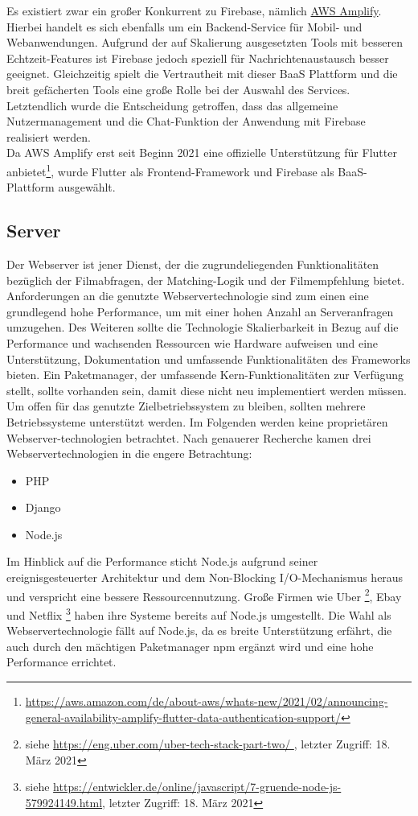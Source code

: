 Es existiert zwar ein großer Konkurrent zu Firebase, nämlich \href{https://docs.amplify.aws/}{AWS Amplify}.
Hierbei handelt es sich ebenfalls um ein Backend-Service für Mobil- und Webanwendungen. 
Aufgrund der auf Skalierung ausgesetzten Tools mit besseren Echtzeit-Features ist Firebase jedoch speziell für Nachrichtenaustausch besser geeignet.
Gleichzeitig spielt die Vertrautheit mit dieser BaaS Plattform und die breit gefächerten Tools eine große Rolle bei der Auswahl des Services.
Letztendlich wurde die Entscheidung getroffen, dass das allgemeine Nutzermanagement und die Chat-Funktion der Anwendung mit Firebase realisiert werden.\\
Da AWS Amplify erst seit Beginn 2021 eine offizielle Unterstützung für Flutter anbietet\footnote{\url{https://aws.amazon.com/de/about-aws/whats-new/2021/02/announcing-general-availability-amplify-flutter-data-authentication-support/}}, wurde Flutter als Frontend-Framework und Firebase als BaaS-Plattform ausgewählt.

\subsection{Server}
\label{sec:server}
Der Webserver ist jener Dienst,  der die zugrundeliegenden Funktionalitäten bezüglich der Filmabfragen, der Matching-Logik und der Filmempfehlung bietet. 
Anforderungen an die genutzte Webservertechnologie sind zum einen eine grundlegend hohe Performance, um mit einer hohen Anzahl an Serveranfragen umzugehen. Des Weiteren sollte die Technologie Skalierbarkeit in Bezug auf die Performance und wachsenden Ressourcen wie Hardware aufweisen und eine Unterstützung, Dokumentation und umfassende Funktionalitäten des Frameworks bieten. 
Ein Paketmanager, der umfassende Kern-Funktionalitäten zur Verfügung stellt, sollte vorhanden sein, damit diese nicht neu implementiert werden müssen. Um offen für das genutzte Zielbetriebssystem zu bleiben, sollten mehrere Betriebssysteme unterstützt werden. 
Im Folgenden werden keine proprietären Webserver-technologien betrachtet.
\newline
Nach genauerer Recherche kamen drei Webservertechnologien in die engere Betrachtung:

\begin{itemize}
	\item PHP
	\item Django
	\item Node.js
\end{itemize} 

\noindent
Im Hinblick auf die Performance sticht Node.js aufgrund seiner ereignisgesteuerter Architektur  und dem Non-Blocking I/O-Mechanismus heraus und verspricht eine bessere Ressourcennutzung. 
\newline
Große Firmen wie Uber \footnote{siehe \url{https://eng.uber.com/uber-tech-stack-part-two/ }, letzter Zugriff: 18. März 2021}, Ebay und Netflix \footnote{siehe \url{https://entwickler.de/online/javascript/7-gruende-node-js-579924149.html}, letzter Zugriff: 18. März 2021 } haben ihre Systeme bereits auf Node.js umgestellt. Die Wahl als Webservertechnologie fällt auf Node.js, da es breite Unterstützung erfährt, die auch durch den mächtigen Paketmanager npm ergänzt wird und eine hohe Performance errichtet.


